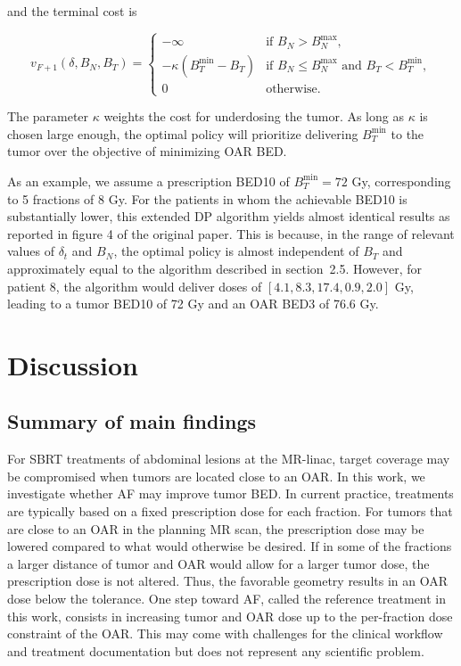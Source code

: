 \documentclass[11pt]{article}
\begin{document}
and the terminal cost is

\[
v_{F+1}(\delta, B_N, B_T) =
\begin{cases}
-\infty & \text{if } B_N > B_N^{\max}, \\
-\kappa \left(B_T^{\min} - B_T\right) & \text{if } B_N \leq B_N^{\max} \text{ and } B_T < B_T^{\min}, \\
0 & \text{otherwise.}
\end{cases}
\]

The parameter $\kappa$ weights the cost for underdosing the tumor. As long as $\kappa$ is chosen large enough, the optimal policy will prioritize delivering $B_T^{\min}$ to the tumor over the objective of minimizing OAR BED.

As an example, we assume a prescription BED10 of $B_T^{\min} = 72$ Gy, corresponding to 5 fractions of 8 Gy. For the patients in whom the achievable BED10 is substantially lower, this extended DP algorithm yields almost identical results as reported in figure 4 of the original paper. This is because, in the range of relevant values of $\delta_t$ and $B_N$, the optimal policy is almost independent of $B_T$ and approximately equal to the algorithm described in section~2.5. However, for patient 8, the algorithm would deliver doses of $[4.1, 8.3, 17.4, 0.9, 2.0]$ Gy, leading to a tumor BED10 of 72 Gy and an OAR BED3 of 76.6 Gy.

\section{Discussion}

\subsection{Summary of main findings}

For SBRT treatments of abdominal lesions at the MR-linac, target coverage may be compromised when tumors are located close to an OAR. In this work, we investigate whether AF may improve tumor BED. In current practice, treatments are typically based on a fixed prescription dose for each fraction. For tumors that are close to an OAR in the planning MR scan, the prescription dose may be lowered compared to what would otherwise be desired. If in some of the fractions a larger distance of tumor and OAR would allow for a larger tumor dose, the prescription dose is not altered. Thus, the favorable geometry results in an OAR dose below the tolerance. One step toward AF, called the reference treatment in this work, consists in increasing tumor and OAR dose up to the per-fraction dose constraint of the OAR. This may come with challenges for the clinical workflow and treatment documentation but does not represent any scientific problem.
\end{document}
